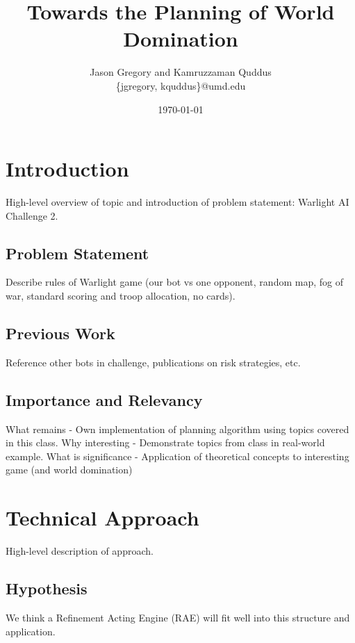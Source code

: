 \documentclass[a4paper,11pt]{article}
\begin{document}
\title{Towards the Planning of World Domination}
\author{Jason Gregory and Kamruzzaman Quddus \\ \{jgregory, kquddus\}@umd.edu}
\date{\today}

\maketitle

%

\section{Introduction}\label{sec:intro}
High-level overview of topic and introduction of problem statement: Warlight AI Challenge 2.

\subsection{Problem Statement}\label{sec:problem}
Describe rules of Warlight game (our bot vs one opponent, random map, fog of war, standard scoring and troop allocation, no cards).

\subsection{Previous Work}\label{sec:previous}
Reference other bots in challenge, publications on risk strategies, etc.

\subsection{Importance and Relevancy}\label{sec:importance}
What remains - Own implementation of planning algorithm using topics covered in this class.
Why interesting - Demonstrate topics from class in real-world example.
What is significance - Application of theoretical concepts to interesting game (and world domination)

%
\section{Technical Approach}\label{sec:approach}
High-level description of approach.

\subsection{Hypothesis}\label{sec:hypothesis}
We think a Refinement Acting Engine (RAE) will fit well into this structure and application.
\end{document}
